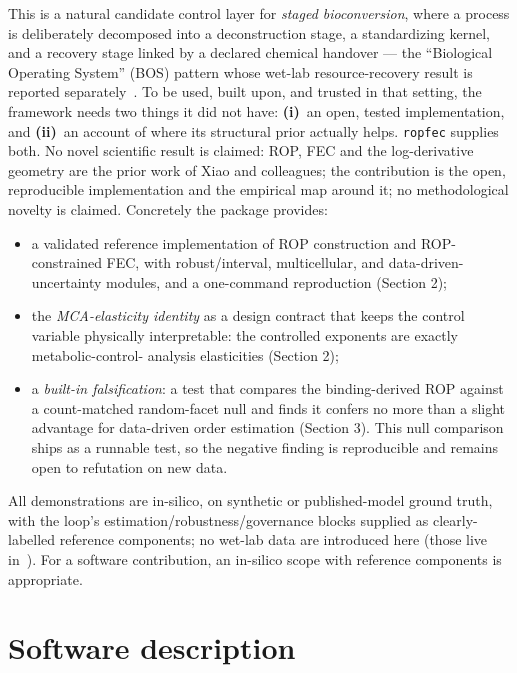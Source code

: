 \documentclass[11pt]{article}
\begin{document}
This is a natural candidate control layer for \emph{staged bioconversion}, where a process
is deliberately decomposed into a deconstruction stage, a standardizing kernel, and a
recovery stage linked by a declared chemical handover --- the ``Biological Operating
System'' (BOS) pattern whose wet-lab resource-recovery result is reported
separately~\citep{paperA}. To be used, built upon, and trusted in that setting, the
framework needs two things it did not have: \textbf{(i)}~an open, tested implementation, and
\textbf{(ii)}~an account of where its structural prior actually helps. \texttt{ropfec}
supplies both. No novel scientific result is claimed: ROP, FEC and the log-derivative
geometry are the prior work of Xiao and colleagues; the contribution is the open,
reproducible implementation and the empirical map around it; no methodological novelty is claimed. Concretely the package provides:
\begin{itemize}\setlength\itemsep{1pt}
\item a validated reference implementation of ROP construction and ROP-constrained FEC, with
robust/interval, multicellular, and data-driven-uncertainty modules, and a one-command
reproduction (Section 2);
\item the \emph{MCA-elasticity identity} as a design contract that keeps the control
variable physically interpretable: the controlled exponents are exactly metabolic-control-
analysis elasticities (Section 2);
\item a \emph{built-in falsification}: a test that compares the binding-derived ROP against
a count-matched random-facet null and finds it confers no more than a slight advantage for
data-driven order estimation (Section 3). This null comparison ships as a runnable test, so
the negative finding is reproducible and remains open to refutation on new data.
\end{itemize}
All demonstrations are in-silico, on synthetic or published-model ground truth, with the
loop's estimation/robustness/governance blocks supplied as clearly-labelled reference
components; no wet-lab data are introduced here (those live in~\citep{paperA}). For a
software contribution, an in-silico scope with reference components is appropriate.

\section{Software description}\label{sec:desc}
\end{document}
